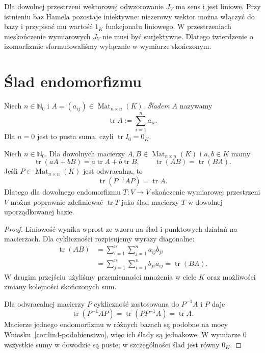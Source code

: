 \begin{uwaga}
\label{rem:lin7-nieskonczony-bidual}
Dla dowolnej przestrzeni wektorowej
odwzorowanie \(J_V\) ma sens i jest
liniowe. Przy istnieniu baz Hamela
pozostaje iniektywne: niezerowy wektor
można włączyć do bazy i przypisać mu
wartość \(1_K\) funkcjonału liniowego.
W przestrzeniach nieskończenie
wymiarowych \(J_V\) nie musi być
surjektywne. Dlatego twierdzenie
o izomorfizmie sformułowaliśmy
wyłącznie w wymiarze skończonym.
\end{uwaga}

\section{Ślad endomorfizmu}
\label{sec:lin7-slad}

\begin{definicja}
\label{def:lin7-slad}
Niech \(n\in\mathbb N_0\) i
\(A=(a_{ij})\in\operatorname{Mat}_{n\times n}(K)\).
\emph{Śladem} \(A\) nazywamy
\[
 \operatorname{tr}A:=\sum_{i=1}^n a_{ii}.
\]
Dla \(n=0\) jest to pusta suma,
czyli \(\operatorname{tr}I_0=0_K\).
\end{definicja}

\begin{twierdzenie}
\label{thm:lin7-slad}
Niech \(n\in\mathbb N_0\).
Dla dowolnych macierzy
\(A,B\in\operatorname{Mat}_{n\times n}(K)\)
i \(a,b\in K\) mamy
\[
 \operatorname{tr}(aA+bB)
 =a\operatorname{tr}A+b\operatorname{tr}B,
 \qquad
 \operatorname{tr}(AB)
 =\operatorname{tr}(BA).
\]
Jeśli \(P\in\operatorname{Mat}_{n\times n}(K)\)
jest odwracalna, to
\[
 \operatorname{tr}(P^{-1}AP)
 =\operatorname{tr}A.
\]
Dlatego dla dowolnego endomorfizmu
\(T\colon V\to V\) skończenie
wymiarowej przestrzeni \(V\)
można poprawnie zdefiniować
\(\operatorname{tr}T\)
jako ślad macierzy \(T\)
w dowolnej uporządkowanej bazie.
\end{twierdzenie}
\begin{proof}
Liniowość wynika wprost ze wzoru
na ślad i punktowych działań
na macierzach. Dla cykliczności
rozpisujemy wyrazy diagonalne:
\[
 \begin{aligned}
 \operatorname{tr}(AB)
 &=\sum_{i=1}^n\sum_{j=1}^n a_{ij}b_{ji}\\
 &=\sum_{j=1}^n\sum_{i=1}^n b_{ji}a_{ij}
 =\operatorname{tr}(BA).
 \end{aligned}
\]
W drugim przejściu użyliśmy
przemienności mnożenia w ciele \(K\)
oraz możliwości zmiany kolejności
skończonych sum.

Dla odwracalnej macierzy \(P\)
cykliczność zastosowana do
\(P^{-1}A\) i \(P\) daje
\[
 \operatorname{tr}(P^{-1}AP)
 =\operatorname{tr}(PP^{-1}A)
 =\operatorname{tr}A.
\]
Macierze jednego endomorfizmu
w różnych bazach są podobne
na mocy
Wniosku~\ref{cor:lin4-podobienstwo},
więc ich ślady są jednakowe.
W wymiarze \(0\) wszystkie sumy
w dowodzie są puste; w szczególności
ślad jest równy \(0_K\).
\end{proof}

